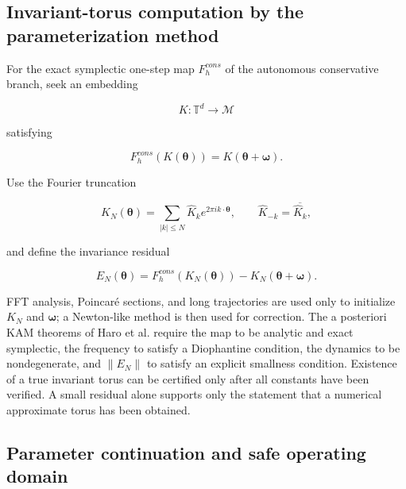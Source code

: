 \subsection{Invariant-torus computation by the parameterization method}\label{sec:symplectic-kam-5-6}

For the exact symplectic one-step map \(F_{h}^{cons}\) of the autonomous conservative branch, seek an embedding

\begin{equation}
\label{eq:symplectic-kam-5-16}
K:\mathbb{T}^{d} \rightarrow \mathcal{M}
\end{equation}

satisfying

\begin{equation}
\label{eq:symplectic-kam-5-17}
\boxed{F_{h}^{cons}\left( K\left( \bm{\theta} \right) \right) = K\left( \bm{\theta} + \bm{\omega} \right).}
\end{equation}

Use the Fourier truncation

\begin{equation}
\label{eq:symplectic-kam-5-18}
K_{N}\left( \bm{\theta} \right) = \sum_{|k| \leq N}^{}{\widehat{K}}_{k}e^{2\pi ik \cdot \bm{\theta}},\quad\quad{\widehat{K}}_{- k} = \overline{{\widehat{K}}_{k}},
\end{equation}

and define the invariance residual

\begin{equation}
\label{eq:symplectic-kam-5-19}
E_{N}\left( \bm{\theta} \right) = F_{h}^{cons}\left( K_{N}\left( \bm{\theta} \right) \right) - K_{N}\left( \bm{\theta} + \bm{\omega} \right).
\end{equation}

FFT analysis, Poincaré sections, and long trajectories are used only to initialize \(K_{N}\) and \(\bm{\omega}\); a Newton-like method is then used for correction. The a posteriori KAM theorems of Haro et al. require the map to be analytic and exact symplectic, the frequency to satisfy a Diophantine condition, the dynamics to be nondegenerate, and \(\parallel E_{N} \parallel\) to satisfy an explicit smallness condition. Existence of a true invariant torus can be certified only after all constants have been verified. A small residual alone supports only the statement that a numerical approximate torus has been obtained\cite{Haro2016Parameterization}.

\subsection{Parameter continuation and safe operating domain}\label{sec:symplectic-kam-5-7}

